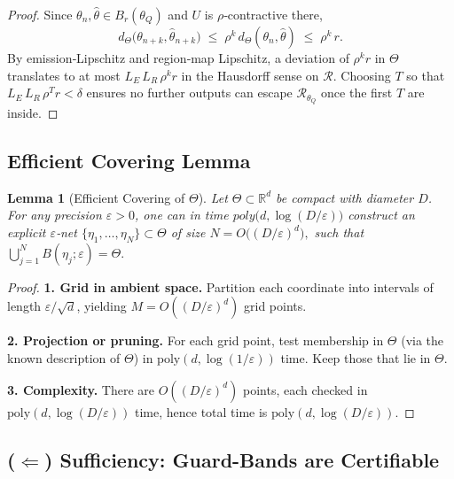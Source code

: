 \documentclass[12pt]{article}
\theoremstyle{definition}
\theoremstyle{plain}
\newtheorem{lemma}{Lemma}[section]
\begin{document}
\begin{proof}
Since $\theta_n,\hat\theta\in B_r(\theta_Q)$ and $U$ is $\rho$‐contractive there, 
\[
  d_\Theta\bigl(\theta_{n+k},\hat\theta_{n+k}\bigr)
  \;\le\;
  \rho^k\,d_\Theta(\theta_n,\hat\theta)
  \;\le\;
  \rho^k\,r.
\]
By emission‐Lipschitz and region‐map Lipschitz, a deviation of $\rho^k r$ in $\Theta$ 
translates to at most $L_E\,L_R\,\rho^k r$ in the Hausdorff sense on $\mathcal R$. 
Choosing $T$ so that $L_E\,L_R\,\rho^T r<\delta$ ensures no further outputs can escape 
$\mathcal R_{\theta_Q}$ once the first $T$ are inside.
\end{proof}

\subsection{Efficient Covering Lemma}
\label{lem:efficient_covering_theta}

\begin{lemma}[Efficient Covering of $\Theta$]
Let $\Theta\subset\mathbb{R}^d$ be compact with diameter $D$.  For any precision $\varepsilon>0$, one can in time
\(
  poly\bigl(d,\log(D/\varepsilon)\bigr)
\)
construct an explicit $\varepsilon$‐net
\(\{\eta_1,\dots,\eta_N\}\subset\Theta\)
of size
\(
  N = O\!\bigl((D/\varepsilon)^d\bigr),
\)
such that
\(\bigcup_{j=1}^N B(\eta_j;\varepsilon)=\Theta.\)

\end{lemma}

\begin{proof}
\textbf{1. Grid in ambient space.}
Partition each coordinate into intervals of length $\varepsilon/\sqrt d$, yielding 
$M=O((D/\varepsilon)^d)$ grid points.

\medskip\noindent
\textbf{2. Projection or pruning.}
For each grid point, test membership in $\Theta$ (via the known description of $\Theta$) 
in $\mathrm{poly}(d,\log(1/\varepsilon))$ time.  Keep those that lie in $\Theta$.  

\medskip\noindent
\textbf{3. Complexity.}
There are $O((D/\varepsilon)^d)$ points, each checked in $\mathrm{poly}(d,\log(D/\varepsilon))$ 
time, hence total time is $\mathrm{poly}(d,\log(D/\varepsilon))$.
\end{proof}


\subsection{($\Leftarrow$) Sufficiency: Guard-Bands are Certifiable}
\end{document}
